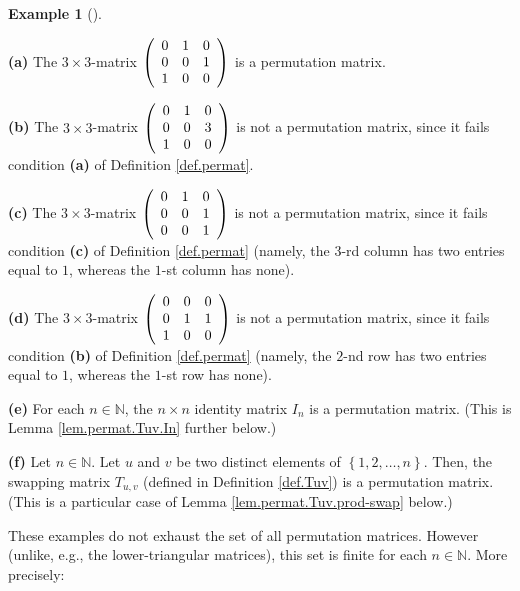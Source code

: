 \documentclass[numbers=enddot,12pt,final,onecolumn,notitlepage]{scrartcl}%
\theoremstyle{definition}
\newtheorem{exam}[theo]{Example}
\newenvironment{example}[1][]
{\begin{exam}[#1]\begin{leftbar}}
{\end{leftbar}\end{exam}}
\begin{document}
\begin{example}
\label{exam.permat}\textbf{(a)} The $3\times3$-matrix $\left(
\begin{array}
[c]{ccc}%
0 & 1 & 0\\
0 & 0 & 1\\
1 & 0 & 0
\end{array}
\right)  $ is a permutation matrix.

\textbf{(b)} The $3\times3$-matrix $\left(
\begin{array}
[c]{ccc}%
0 & 1 & 0\\
0 & 0 & 3\\
1 & 0 & 0
\end{array}
\right)  $ is not a permutation matrix, since it fails condition \textbf{(a)}
of Definition \ref{def.permat}.

\textbf{(c)} The $3\times3$-matrix $\left(
\begin{array}
[c]{ccc}%
0 & 1 & 0\\
0 & 0 & 1\\
0 & 0 & 1
\end{array}
\right)  $ is not a permutation matrix, since it fails condition \textbf{(c)}
of Definition \ref{def.permat} (namely, the $3$-rd column has two entries
equal to $1$, whereas the $1$-st column has none).

\textbf{(d)} The $3\times3$-matrix $\left(
\begin{array}
[c]{ccc}%
0 & 0 & 0\\
0 & 1 & 1\\
1 & 0 & 0
\end{array}
\right)  $ is not a permutation matrix, since it fails condition \textbf{(b)}
of Definition \ref{def.permat} (namely, the $2$-nd row has two entries equal
to $1$, whereas the $1$-st row has none).

\textbf{(e)} For each $n\in\mathbb{N}$, the $n\times n$ identity matrix
$I_{n}$ is a permutation matrix. (This is Lemma \ref{lem.permat.Tuv.In}
further below.)

\textbf{(f)} Let $n\in\mathbb{N}$. Let $u$ and $v$ be two distinct elements of
$\left\{  1,2,\ldots,n\right\}  $. Then, the swapping matrix $T_{u,v}$
(defined in Definition \ref{def.Tuv}) is a permutation matrix. (This is a
particular case of Lemma \ref{lem.permat.Tuv.prod-swap} below.)
\end{example}

These examples do not exhaust the set of all permutation matrices. However
(unlike, e.g., the lower-triangular matrices), this set is finite for each
$n\in\mathbb{N}$. More precisely:
\end{document}
